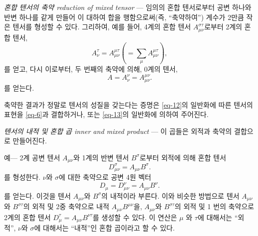 \emph{혼합 텐서의 축약 reduction of mixed tensor} ---
임의의 혼합 텐서로부터 공변 \Index{} 하나와 반변 \Index{} 하나를 같게 만들어 이  대하여 합을 행함으로써(즉, ``축약하여'') 계수가 2만큼 작은 텐서를 형성할 수 있다. 그리하여, 예를 들어, 4계의 혼합 텐서 $A_{\mu\nu}^{\sigma\tau}$로부터 2계의 혼합 텐서,
\begin{equation*}
	A_\nu^\tau = A_{\mu\nu}^{\mu\tau} \left(=\sum_\mu A_{\mu\nu}^{\mu\tau}\right),
\end{equation*}
를 얻고, 다시 이로부터, 두 번째의 축약에 의해, 0계의 텐서,
\begin{equation*}
	A = A_\nu^\nu = A_{\mu\nu}^{\mu\nu}.
\end{equation*}
를 얻는다.

축약한 결과가 정말로 텐서의 성질을 갖는다는 증명은 \eqref{eq-12}의 일반화에 따른 텐서의 표현을 \eqref{eq-6}과 결합하거나, 또는 \eqref{eq-13}의 일반화에 의하여 주어진다.

\emph{텐서의 내적 및 혼합 곱 inner and mixed product} ---
이 곱들은 외적과 축약의 결합으로 만들어진다.

예--- 2계 공변 텐서 $A_{\mu\nu}$와 1계의 반변 텐서 $B^{\sigma}$로부터 외적에 의해 혼합 텐서 
\begin{equation*}
	D_{\mu\nu}^{\sigma}=A_{\mu\nu} B^{\sigma}.
\end{equation*}
를 형성한다. \Index{} $\nu$와 $\sigma$에 대한 축약으로 공변 4원 벡터
\begin{equation*}
	D_\mu = D_{\mu\nu}^{\nu}=A_{\mu\nu} B^{\nu}.
\end{equation*}
를 얻는다. 이것을 텐서 $A_{\mu\nu}$와  $B^{\sigma}$의 내적이라 부른다. 이와 비슷한 방법으로 
텐서 $A_{\mu\nu}$와 $B^{\sigma\tau}$의 외적 및 2중 축약으로 내적 $A_{\mu\nu} B^{\mu\nu}$을, $A_{\mu\nu}$와 $B^{\sigma\tau}$의 외적 및 1 번의 축약으로 2계의 혼합 텐서 $D_\mu^\tau=A_{\mu\nu} B^{\nu\tau}$를 생성할 수 있다. 이 연산은 \Index{} $\mu$ 와 $\tau$에 대해서는 ``외적'', \Index{} $\nu$와 $\sigma$에 대해서는 ``내적''인 혼합 곱이라고 할 수 있다.

